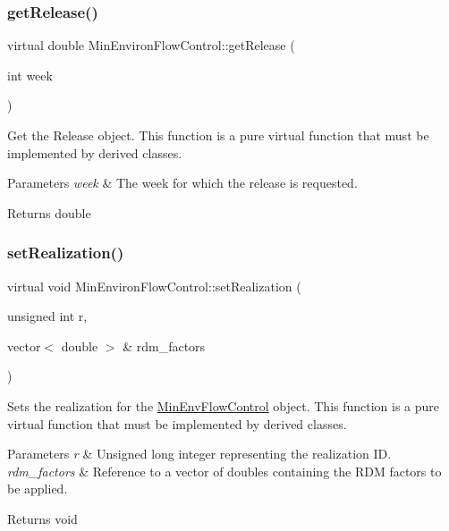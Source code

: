 \subsubsection{\texorpdfstring{get\+Release()}{getRelease()}}
{\footnotesize\ttfamily virtual double Min\+Environ\+Flow\+Control\+::get\+Release (\begin{DoxyParamCaption}\item[{int}]{week }\end{DoxyParamCaption})\hspace{0.3cm}{\ttfamily [pure virtual]}}



Get the Release object. This function is a pure virtual function that must be implemented by derived classes. 


\begin{DoxyParams}{Parameters}
{\em week} & The week for which the release is requested.\\
\hline
\end{DoxyParams}
\begin{DoxyReturn}{Returns}
double 
\end{DoxyReturn}
\mbox{\label{classMinEnvironFlowControl_ae8ba384400c2d4302cefb9ca6eaec3a8}} 
\subsubsection{\texorpdfstring{set\+Realization()}{setRealization()}}
{\footnotesize\ttfamily virtual void Min\+Environ\+Flow\+Control\+::set\+Realization (\begin{DoxyParamCaption}\item[{unsigned int}]{r,  }\item[{vector$<$ double $>$ \&}]{rdm\+\_\+factors }\end{DoxyParamCaption})\hspace{0.3cm}{\ttfamily [virtual]}}



Sets the realization for the {\ttfamily \mbox{\hyperlink{classMinEnvFlowControl}{Min\+Env\+Flow\+Control}}} object. This function is a pure virtual function that must be implemented by derived classes. 


\begin{DoxyParams}{Parameters}
{\em r} & Unsigned long integer representing the realization ID. \\
\hline
{\em rdm\+\_\+factors} & Reference to a vector of doubles containing the R\+DM factors to be applied.\\
\hline
\end{DoxyParams}
\begin{DoxyReturn}{Returns}
void 
\end{DoxyReturn}


